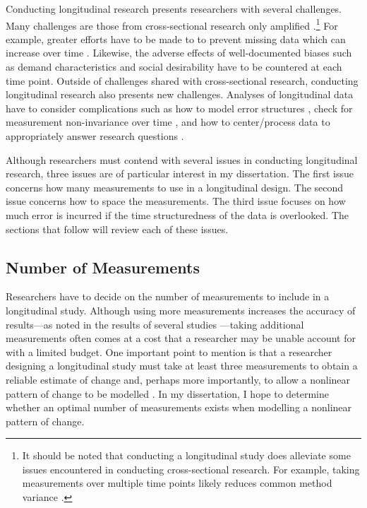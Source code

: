 \documentclass[
12pt, %
twoside,
english]{guelphthesis}
\begin{document}
Conducting longitudinal research presents researchers with several challenges. Many challenges are those from cross-sectional research only amplified \autocite[for a review, see][]{bergman1993}.\footnote{It should be noted that conducting a longitudinal study does alleviate some issues encountered in conducting cross-sectional research. For example, taking measurements over multiple time points likely reduces common method variance \parencites{podsakoff2003}[for an example, see ][]{ostroff2002}.} For example, greater efforts have to be made to to prevent missing data which can increase over time \autocite{newman2008,dillman2014}. Likewise, the adverse effects of well-documented biases such as demand characteristics \autocite{orne1962} and social desirability \autocite{nederhof1985} have to be countered at each time point. Outside of challenges shared with cross-sectional research, conducting longitudinal research also presents new challenges. Analyses of longitudinal data have to consider complications such as how to model error structures \autocite{grimm2010a}, check for measurement non-invariance over time \autocite[the extent to which a construct is measured with the same measurement model over time;][]{mellenbergh1989}, and how to center/process data to appropriately answer research questions \autocite{enders2007,wang2015}.

Although researchers must contend with several issues in conducting longitudinal research, three issues are of particular interest in my dissertation. The first issue concerns how many measurements to use in a longitudinal design. The second issue concerns how to space the measurements. The third issue focuses on how much error is incurred if the time structuredness of the data is overlooked. The sections that follow will review each of these issues.

\hypertarget{number-of-measurements}{%
\subsection{Number of Measurements}\label{number-of-measurements}}

Researchers have to decide on the number of measurements to include in a longitudinal study. Although using more measurements increases the accuracy of results---as noted in the results of several studies \autocites[e.g.,][]{coulombe2016,timmons2015,finch2017,fine2019}---taking additional measurements often comes at a cost that a researcher may be unable account for with a limited budget. One important point to mention is that a researcher designing a longitudinal study must take at least three measurements to obtain a reliable estimate of change and, perhaps more importantly, to allow a nonlinear pattern of change to be modelled \autocite{ployhart2010}. In my dissertation, I hope to determine whether an optimal number of measurements exists when modelling a nonlinear pattern of change.
\end{document}
